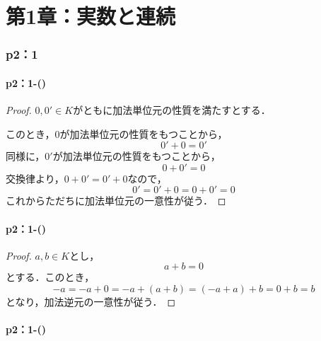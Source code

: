 \documentclass[a4paper,10pt,fleqn]{ltjsarticle}
\begin{document}
\part*{第1章：実数と連続}

\section*{p2：1}


\subsection*{p2：1-()}

\begin{leftbar}
    \begin{proof}
        $0,0' \in K$がともに加法単位元の性質を満たすとする．

        このとき，$0$が加法単位元の性質をもつことから，
        \[
            0'+0=0'
        \]
        同様に，$0'$が加法単位元の性質をもつことから，
        \[
            0+0' = 0
        \]
        交換律より，$0+0'=0'+0$なので，
        \[
            0'=0'+0 =0+0' =0
        \]
        これからただちに加法単位元の一意性が従う．
    \end{proof}
\end{leftbar}

\subsection*{p2：1-()}

\begin{leftbar}
    \begin{proof}
        $a ,b \in K$とし，
        \[
            a+b =0
        \]
        とする．このとき，
        \[
            -a = -a+0 = -a +(a+b)=(-a+a)+b =0+b = b
        \]
        となり，加法逆元の一意性が従う．
    \end{proof}
\end{leftbar}

\subsection*{p2：1-()}
\end{document}
